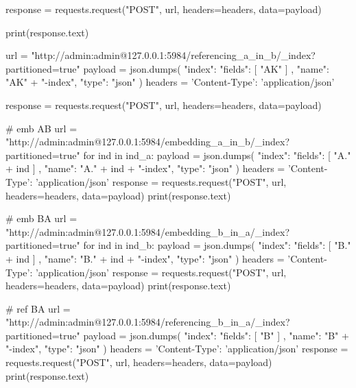 \begin{Verbatim*}
        response = requests.request("POST", url, headers=headers, data=payload)

        print(response.text)

url = "http://admin:admin@127.0.0.1:5984/referencing_a_in_b/_index?partitioned=true"
payload = json.dumps({
  "index": {
    "fields": [
      "AK"
    ]
  },
  "name": "AK" + "-index",
  "type": "json"
})
headers = {
  'Content-Type': 'application/json'
}

response = requests.request("POST", url, headers=headers, data=payload)

# emb AB
url = "http://admin:admin@127.0.0.1:5984/embedding_a_in_b/_index?partitioned=true"
for ind in ind_a:
  payload = json.dumps({
    "index": {
      "fields": [
        "A." + ind
      ]
    },
    "name": "A." + ind + "-index",
    "type": "json"
  })
  headers = {
    'Content-Type': 'application/json'
  }
  response = requests.request("POST", url, headers=headers, data=payload)
  print(response.text)

# emb BA
url = "http://admin:admin@127.0.0.1:5984/embedding_b_in_a/_index?partitioned=true"
for ind in ind_b:
  payload = json.dumps({
    "index": {
      "fields": [
        "B." + ind
      ]
    },
    "name": "B." + ind + "-index",
    "type": "json"
  })
  headers = {
    'Content-Type': 'application/json'
  }
  response = requests.request("POST", url, headers=headers, data=payload)
  print(response.text)

# ref BA
url = "http://admin:admin@127.0.0.1:5984/referencing_b_in_a/_index?partitioned=true"
payload = json.dumps({
  "index": {
    "fields": [
      "B"
    ]
  },
  "name": "B" + "-index",
  "type": "json"
})
headers = {
  'Content-Type': 'application/json'
}
response = requests.request("POST", url, headers=headers, data=payload)
print(response.text)
\end{Verbatim*}